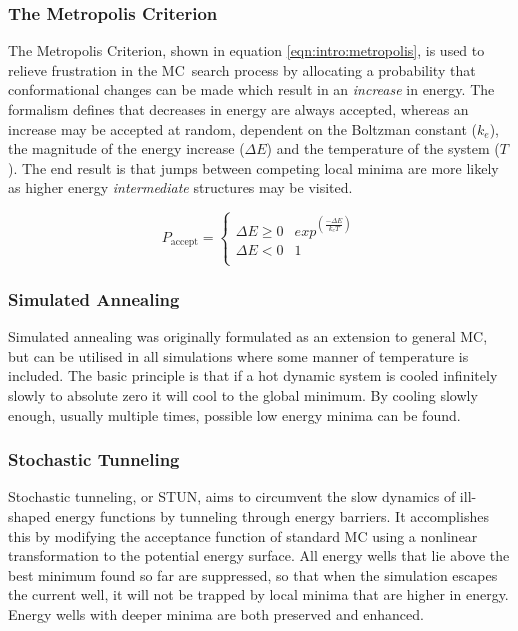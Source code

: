 \subsubsection{The Metropolis Criterion}

The Metropolis Criterion\cite{SIMULATION:Metropolis}, shown in equation \ref{eqn:intro:metropolis}, is
used to relieve frustration in the MC\ search process by allocating a probability
that conformational changes can be made which result in an \emph{increase} in energy.
The formalism defines that decreases in energy are always accepted, whereas
an increase may be accepted at random, dependent on the Boltzman constant
($k_e$),
the magnitude of the energy increase ($\Delta E$) and the temperature of the system ($T$).
The end result is that jumps between competing local minima are more likely
as higher energy \emph{intermediate} structures may be visited.

 
\begin{equation}
P_\mathrm{accept} = \left\{ \begin{array}{ll}
 \Delta E \ge 0
  & exp^{ \left( \displaystyle \frac{- \Delta E}{k_eT} \right) } \\
\Delta E < 0
  & 1 \\
\end{array}
\right.
\label{eqn:intro:metropolis}
\end{equation}

\subsubsection{Simulated Annealing} 

Simulated annealing\cite{SIMULATION:SimulatedAnnealing} was originally formulated
as an extension to general MC, but can be utilised in all simulations where
some manner of temperature is included. The basic principle is that if
a hot dynamic system is cooled infinitely slowly to absolute zero it will cool to
the global minimum. By  cooling slowly enough, usually multiple times, possible
low energy minima can be found.


\subsubsection{Stochastic Tunneling}
\label{section:protmodel:stun}

Stochastic tunneling, or STUN\cite{SIMULATION:STUN}, aims to circumvent the slow dynamics of ill-shaped energy functions  by tunneling through energy barriers. It accomplishes this by modifying the acceptance function of standard MC  using a nonlinear
transformation to the potential energy surface. All energy wells that lie above the best minimum found so far are suppressed, so that when the simulation escapes the current well, it will not be trapped by local minima that are higher in energy. Energy wells with deeper minima are both preserved and enhanced.

